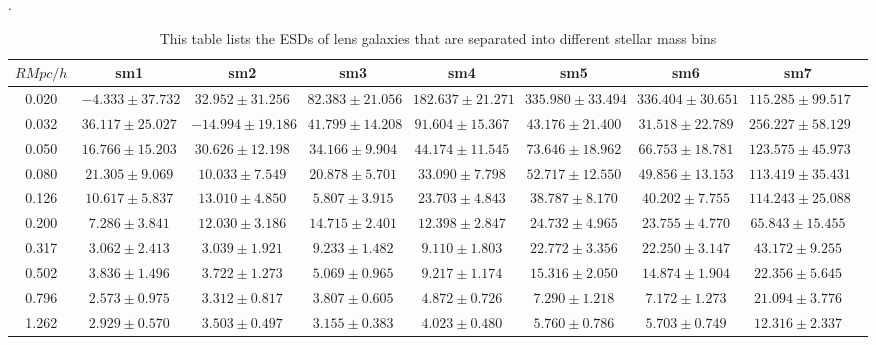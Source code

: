 \documentclass[apj]{emulateapj}
\begin{document}
\begin{table}[h!]
\begin{center}
 \caption{\label{tab:ESD-sm7} This table lists the ESDs of lens
   galaxies that are separated into different stellar mass bins}.
\begin{tabular}{ccccccccc}
\hline
$R Mpc/h$ & sm1 & sm2 & sm3 & sm4 & sm5 & sm6 & sm7 \\
\hline
0.020 & $-4.333 \pm 37.732$  & $32.952 \pm 31.256$   & $82.383 \pm 21.056$    & $182.637 \pm 21.271$  & $335.980 \pm 33.494$   & $336.404 \pm 30.651$ & $115.285 \pm 99.517$ \\
0.032 & $36.117 \pm 25.027$  & $-14.994\pm 19.186$   & $41.799 \pm 14.208$    & $91.604  \pm 15.367$  & $43.176  \pm 21.400$   & $31.518 \pm 22.789$ & $256.227 \pm 58.129 $ \\
0.050 & $16.766 \pm 15.203$  & $30.626 \pm 12.198$   & $34.166 \pm 9.904 $    & $44.174  \pm 11.545$  & $73.646  \pm 18.962$   & $66.753 \pm 18.781$ & $123.575 \pm 45.973 $ \\
0.080 & $21.305 \pm 9.069 $  & $10.033 \pm 7.549 $   & $20.878 \pm 5.701 $    & $33.090  \pm 7.798 $  & $52.717  \pm 12.550$   & $49.856 \pm 13.153$ & $113.419 \pm 35.431 $ \\
0.126 & $10.617 \pm 5.837 $  & $13.010 \pm 4.850 $   & $5.807  \pm 3.915 $    & $23.703  \pm 4.843 $  & $38.787  \pm 8.170 $   & $40.202 \pm 7.755 $ & $114.243 \pm 25.088 $ \\
0.200 & $7.286  \pm 3.841 $  & $12.030 \pm 3.186 $   & $14.715 \pm 2.401 $    & $12.398  \pm 2.847 $  & $24.732  \pm 4.965 $   & $23.755 \pm 4.770 $ & $65.843 \pm 15.455 $ \\
0.317 & $3.062  \pm 2.413 $  & $3.039  \pm 1.921 $   & $9.233  \pm 1.482 $    & $9.110   \pm 1.803 $  & $22.772  \pm 3.356 $   & $22.250 \pm 3.147 $ & $43.172 \pm 9.255 $ \\
0.502 & $3.836  \pm 1.496 $  & $3.722  \pm 1.273 $   & $5.069  \pm 0.965 $    & $9.217   \pm 1.174 $  & $15.316  \pm 2.050 $   & $14.874 \pm 1.904 $ & $22.356 \pm 5.645 $ \\
0.796 & $2.573  \pm 0.975 $  & $3.312  \pm 0.817 $   & $3.807  \pm 0.605 $    & $4.872   \pm 0.726 $  & $7.290   \pm 1.218 $   & $7.172 \pm  1.273 $ & $21.094 \pm 3.776 $ \\
1.262 & $2.929  \pm 0.570 $  & $3.503  \pm 0.497 $   & $3.155  \pm 0.383 $    & $4.023   \pm 0.480 $  & $5.760   \pm 0.786 $   & $5.703 \pm 0.749 $ & $12.316  \pm 2.337 $ \\
\hline
\end{tabular}
\end{center}
\end{table}
\end{document}
